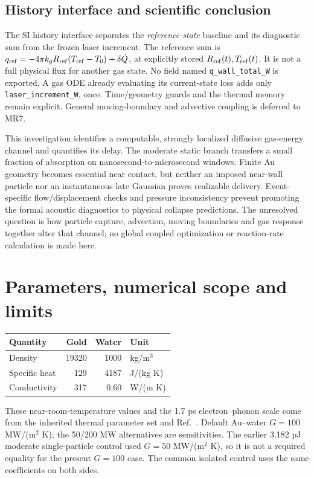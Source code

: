 \documentclass[10pt,a4paper]{article}
\begin{document}
\subsection*{History interface and scientific conclusion}
The SI history interface separates the \emph{reference-state} baseline and its diagnostic sum from the frozen laser increment. The reference sum is $q_{\rm ref}= -4\pi k_gR_{\rm ref}(T_{\rm ref}-T_0)+\delta\dot Q$, at explicitly stored $R_{\rm ref}(t),T_{\rm ref}(t)$. It is not a full physical flux for another gas state. No field named \texttt{q\_wall\_total\_W} is exported. A gas ODE already evaluating its current-state loss adds only \texttt{laser\_increment\_W}, once. Time/geometry guards and the thermal memory remain explicit. General moving-boundary and advective coupling is deferred to MR7.

This investigation identifies a computable, strongly localized diffusive gas-energy channel and quantifies its delay. The moderate static branch transfers a small fraction of absorption on nanosecond-to-microsecond windows. Finite Au geometry becomes essential near contact, but neither an imposed near-wall particle nor an instantaneous late Gaussian proves realizable delivery. Event-specific flow/displacement checks and pressure inconsistency prevent promoting the formal acoustic diagnostics to physical collapse predictions. The unresolved question is how particle capture, advection, moving boundaries and gas response together alter that channel; no global coupled optimization or reaction-rate calculation is made here.
\newpage

\appendix
\section{Parameters, numerical scope and limits}
\begin{center}\small
\begin{tabular}{lrrl}\toprule
Quantity&Gold&Water&Unit\\\midrule
Density&19320&1000&kg/m$^3$\\
Specific heat&129&4187&J/(kg K)\\
Conductivity&317&0.60&W/(m K)\\\bottomrule
\end{tabular}
\end{center}
These near-room-temperature values and the 1.7 ps electron--phonon scale come from the inherited thermal parameter set and Ref.~\cite{BR}. Default Au--water $G=100$ MW/(m$^2$ K); the 50/200 MW alternatives are sensitivities. The earlier 3.182 pJ moderate single-particle control used $G=50$ MW/(m$^2$ K), so it is not a required equality for the present $G=100$ case. The common isolated control uses the same coefficients on both sides.
\end{document}
